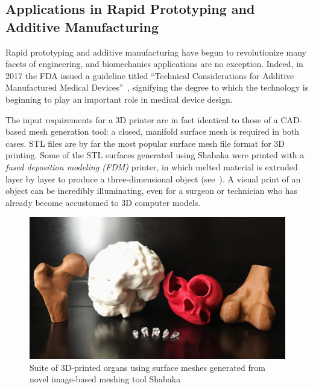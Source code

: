 \subsection[Applications in Rapid Prototyping and Additive Manufacturing]{\texorpdfstring{Applications in Rapid Prototyping and Additive \newline Manufacturing}{Applications in Rapid Prototyping and Additive \newline Manufacturing}}
\label{Applications in Rapid Prototyping and Additive Manufacturing}

Rapid prototyping and additive manufacturing have begun to revolutionize many facets of engineering, and biomechanics applications are no exception. Indeed, in 2017 the FDA issued a guideline titled ``Technical Considerations for Additive Manufactured Medical Devices''~\cite{fda3_2016}, signifying the degree to which the technology is beginning to play an important role in medical device design.

The input requirements for a 3D printer are in fact identical to those of a CAD-based mesh generation tool: a closed, manifold surface mesh is required in both cases. STL files are by far the most popular surface mesh file format for 3D printing. Some of the STL surfaces generated using Shabaka were printed with a \textit{fused deposition modeling (FDM)} printer, in which melted material is extruded layer by layer to produce a three-dimensional object (see~). A visual print of an object can be incredibly illuminating, even for a surgeon or technician who has already become accustomed to 3D computer models.

\begin{figure}
\centering
		\includegraphics[width=1.0\textwidth]{media/6-3dprint/3dprint.jpg}
%
\caption{Suite of 3D-printed organs using surface meshes generated from novel image-based meshing tool Shabaka}
\label{fig:3dprint}
\end{figure}

